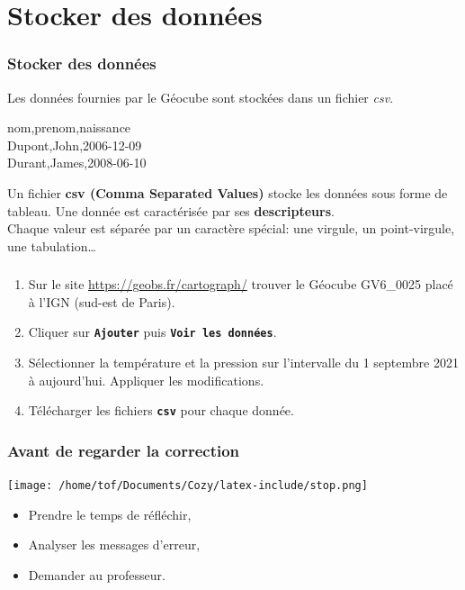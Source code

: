 \documentclass[svgnames,11pt]{beamer}
\begin{document}
\section{Stocker des données}
\begin{frame}
    \frametitle{Stocker des données}
    Les données fournies par le Géocube sont stockées dans un fichier \emph{csv}.
    \begin{center}
        nom,prenom,naissance\\
        Dupont,John,2006-12-09\\
        Durant,James,2008-06-10
    \end{center}
\begin{aretenir}[]
    Un fichier \textbf{csv (Comma Separated Values)} stocke les données sous forme de tableau. Une donnée est caractérisée par ses \textbf{descripteurs}. \\
    Chaque valeur est séparée par un caractère spécial: une virgule, un point-virgule, une tabulation\dots
\end{aretenir}   

\end{frame}
\begin{frame}
    \frametitle{}

    \begin{activite}
    \begin{enumerate}
        \item Sur le site \url{https://geobs.fr/cartograph/} trouver le Géocube GV6\_0025 placé à l'IGN (sud-est de Paris).
        \item Cliquer sur \textbf{\texttt{Ajouter}} puis \textbf{\texttt{Voir les données}}.
        \item Sélectionner la température et la pression sur l'intervalle du 1 septembre 2021 à aujourd'hui. Appliquer les modifications.
        \item Télécharger les fichiers \textbf{\texttt{csv}} pour chaque donnée.
    \end{enumerate}
    \end{activite}

\end{frame}
\begin{frame}
    \frametitle{Avant de regarder la correction}
\begin{center}
    \centering
    \texttt{[image: /home/tof/Documents/Cozy/latex-include/stop.png]}
    \end{center}
{\Large
    \begin{itemize}
        \item Prendre le temps de réfléchir,
        \item Analyser les messages d'erreur,
        \item Demander au professeur.
    \end{itemize}
}
\end{frame}
\end{document}
